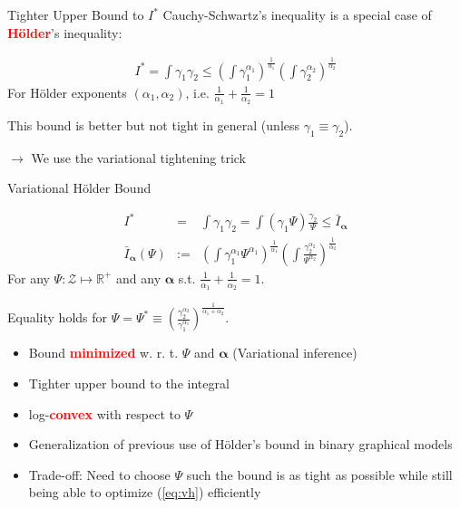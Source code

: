 \documentclass{beamer}
\newcommand{\Holder}{H\"older\xspace}
\newcommand{\balpha}{{\bm{\alpha}}}
\renewcommand{\Re}{\mathbb{R}}
\renewcommand{\emph}[1]{\textcolor{red}{\textbf{#1}}}
\begin{document}
\begin{frame}{Tighter Upper Bound to $I^*$}
	Cauchy-Schwartz's inequality is a special case of \emph{\Holder}'s inequality:
	
	\begin{eqnarray}
	I^*= \int \gamma_1\gamma_2
	\le 
	\left(\int \gamma^{\alpha_1}_1\right)^{\frac 1{\alpha_1}}
	\left(\int \gamma^{\alpha_2}_2\right)^{\frac 1{\alpha_2}}
	\end{eqnarray}
	For \Holder exponents $(\alpha_1,\alpha_2)$, i.e. $\frac 1{\alpha_1} + \frac 1{\alpha_2} = 1$
	
	This bound is better but not tight in general (unless $\gamma_1\equiv\gamma_2$).
	
	\vspace{1cm}
	$\rightarrow$ We use the variational tightening trick
\end{frame}



\begin{frame}{Variational \Holder  Bound}
	
	\begin{eqnarray}
	I^*&=& \int \gamma_1\gamma_2 = \int (\gamma_1\Psi) \frac{\gamma_2}{\Psi}
	\le \bar{I}_{\balpha}
	\\
	\bar{I}_{\balpha}(\Psi) &:=& \left(\int \gamma^{\alpha_1}_1 \Psi^{\alpha_1}\right)^{\frac 1{\alpha_1}}
	\left(\int \frac{\gamma^{\alpha_2}_2}{\Psi^{\alpha_2}}\right)^{\frac 1{\alpha_2}} \label{eq:vh}
	\end{eqnarray}
	For any $\Psi:\mathcal{Z}\mapsto\Re^+$ and any $\bm\alpha$ s.t. $\frac 1{\alpha_1} + \frac 1{\alpha_2} = 1$.
	
	Equality holds for $\Psi=\Psi^*\equiv\left(\frac{\gamma_2^{\alpha_2}}{\gamma_1^{\alpha_1}}\right)^{\frac{1}{\alpha_1+\alpha_2}} $.

	\begin{itemize}
		\item Bound \emph{minimized} w. r. t. $\Psi$ and $\balpha$ (Variational inference)
		\item Tighter upper bound to the integral
		\item log-\emph{convex} with respect to $\Psi$  %
		\item Generalization of previous use of \Holder's bound in binary graphical models~\citep{liu11d}
		\item Trade-off: Need to choose $\Psi$ such the bound is as tight as possible while still being able to optimize (\ref{eq:vh})  efficiently 
	\end{itemize}
\end{frame}
\end{document}
